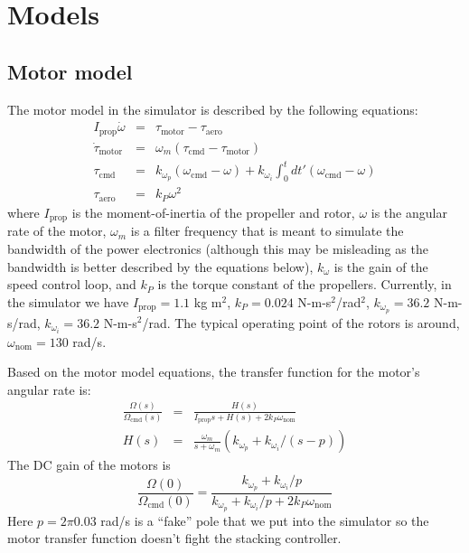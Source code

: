 \documentclass[11pt]{amsart}
\begin{document}
\section{Models}

\subsection{Motor model}

The motor model in the simulator is described by the following
equations:
\begin{eqnarray}
I_{\mathrm{prop}} \dot \omega &=&
\tau_{\mathrm{motor}} - \tau_{\mathrm{aero}} \\
\dot \tau_{\mathrm{motor}} &=&
\omega_m (\tau_{\mathrm{cmd}} - \tau_{\mathrm{motor}}) \\
\tau_{\mathrm{cmd}} &=&
k_{{\omega}_p} \left( \omega_{\mathrm{cmd}} - \omega \right) +
k_{{\omega}_i} \int_0^t dt' \left( \omega_{\mathrm{cmd}} - \omega \right) \\
\tau_{\mathrm{aero}} &=& k_P \omega^2
\end{eqnarray}
where $I_{\mathrm{prop}}$ is the moment-of-inertia of the propeller
and rotor, $\omega$ is the angular rate of the motor, $\omega_m$ is a
filter frequency that is meant to simulate the bandwidth of the power
electronics (although this may be misleading as the bandwidth is
better described by the equations below), $k_{\omega}$ is the gain of
the speed control loop, and $k_P$ is the torque constant of the
propellers.  Currently, in the simulator we have $I_{\mathrm{prop}} = 1.1$
kg m$^2$, $k_P = 0.024$ N-m-s$^2$/rad$^2$, $k_{{\omega}_p} = 36.2$ N-m-s/rad,
$k_{{\omega}_i} = 36.2$  N-m-s$^2$/rad.  The typical operating point of the
rotors is around, $\omega_{\mathrm{nom}} = 130$ rad/s.

Based on the motor model equations, the transfer function for the
motor's angular rate is:
\begin{eqnarray}
\frac{\Omega(s)}{\Omega_{\mathrm{cmd}}(s)}
&=& \frac{H(s)}{I_{\mathrm{prop}} s + H(s) + 2 k_P \omega_{\mathrm{nom}}} \\
H(s) &=& \frac{\omega_m}{s + \omega_m} (k_{{\omega}_p} + k_{{\omega}_i} / (s - p))
\end{eqnarray}
The DC gain of the motors is
\begin{equation}
\frac{\Omega(0)}{\Omega_{\mathrm{cmd}}(0)} =
\frac{k_{{\omega}_p} + k_{{\omega}_i} / p}
{k_{{\omega}_p} + k_{{\omega}_i} / p + 2 k_P \omega_{\mathrm{nom}}}
\end{equation}
Here $p = 2 \pi 0.03$ rad/s is a ``fake'' pole that we put into the
simulator so the motor transfer function doesn't fight the stacking
controller.
\end{document}
